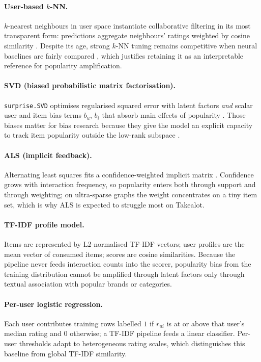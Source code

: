 \paragraph{User-based $k$-NN.}
$k$-nearest neighbours in user space instantiate collaborative filtering in its most transparent form: predictions aggregate neighbours' ratings weighted by cosine similarity \citep{resnick1994grouplens}. Despite its age, strong $k$-NN tuning remains competitive when neural baselines are fairly compared \citep{ferrari2019progress}, which justifies retaining it as an interpretable reference for popularity amplification.

\paragraph{SVD (biased probabilistic matrix factorisation).}
\texttt{surprise.SVD} optimises regularised squared error with latent factors \emph{and} scalar user and item bias terms $b_u$, $b_i$ that absorb main effects of popularity \citep{koren2009matrix}. Those biases matter for bias research because they give the model an explicit capacity to track item popularity outside the low-rank subspace \citep{abdollahpouri2019unfairness, abdollahpouri2021usercentered}.

\paragraph{ALS (implicit feedback).}
Alternating least squares fits a confidence-weighted implicit matrix \citep{hu2008collaborative}. Confidence grows with interaction frequency, so popularity enters both through support and through weighting; on ultra-sparse graphs the weight concentrates on a tiny item set, which is why ALS is expected to struggle most on Takealot.

\paragraph{TF-IDF profile model.}
Items are represented by L2-normalised TF-IDF vectors; user profiles are the mean vector of consumed items; scores are cosine similarities. Because the pipeline never feeds interaction counts into the scorer, popularity bias from the training distribution cannot be amplified through latent factors only through textual association with popular brands or categories.

\paragraph{Per-user logistic regression.}
Each user contributes training rows labelled $1$ if $r_{ui}$ is at or above that user's median rating and $0$ otherwise; a TF-IDF pipeline feeds a linear classifier. Per-user thresholds adapt to heterogeneous rating scales, which distinguishes this baseline from global TF-IDF similarity.

